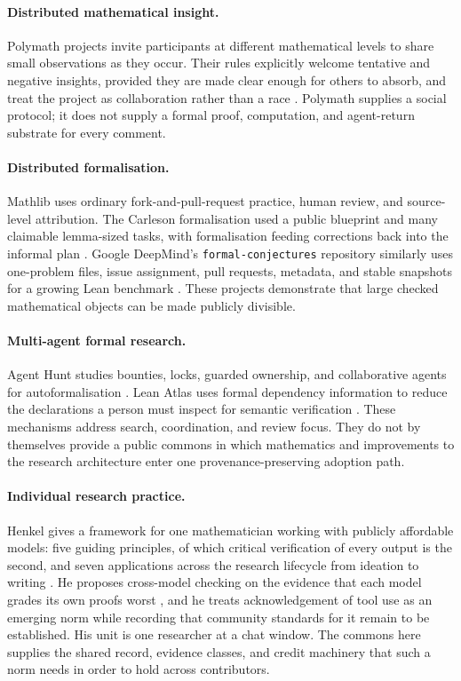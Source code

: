 \documentclass[10pt]{article}
\begin{document}
\paragraph{Distributed mathematical insight.}
Polymath projects invite participants at different mathematical levels to
share small observations as they occur.  Their rules explicitly welcome
tentative and negative insights, provided they are made clear enough for
others to absorb, and treat the project as collaboration rather than a race
\cite{polymath}.  Polymath supplies a social protocol; it does not supply a
formal proof, computation, and agent-return substrate for every comment.

\paragraph{Distributed formalisation.}
Mathlib uses ordinary fork-and-pull-request practice, human review, and
source-level attribution.  The Carleson formalisation used a public blueprint
and many claimable lemma-sized tasks, with formalisation feeding corrections
back into the informal plan \cite{mathlib,carleson}.  Google DeepMind's
\texttt{formal-conjectures} repository similarly uses one-problem files,
issue assignment, pull requests, metadata, and stable snapshots for a growing
Lean benchmark \cite{formalconjectures}.  These projects demonstrate that
large checked mathematical objects can be made publicly divisible.

\paragraph{Multi-agent formal research.}
Agent Hunt studies bounties, locks, guarded ownership, and collaborative
agents for autoformalisation \cite{agenthunt}.  Lean Atlas uses formal
dependency information to reduce the declarations a person must inspect for
semantic verification \cite{leanatlas}.  These mechanisms address search,
coordination, and review focus.  They do not by themselves provide a public
commons in which mathematics and improvements to the research architecture
enter one provenance-preserving adoption path.

\paragraph{Individual research practice.}
Henkel gives a framework for one mathematician working with publicly
affordable models: five guiding principles, of which critical verification
of every output is the second, and seven applications across the research
lifecycle from ideation to writing \cite{henkel}.  He proposes cross-model
checking on the evidence that each model grades its own proofs worst
\cite{openproofcorpus}, and he treats acknowledgement of tool use as an
emerging norm while recording that community standards for it remain to be
established.  His unit is one researcher at a chat window.  The commons here
supplies the shared record, evidence classes, and credit machinery that such
a norm needs in order to hold across contributors.
\end{document}
